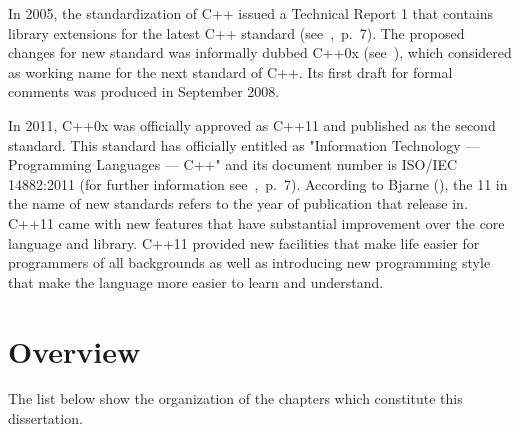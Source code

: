 \documentclass[11pt]{report}
\begin{document}
In 2005, the standardization of C++ issued a Technical Report 1 that contains library extensions for the latest C++ standard (see~\cite{Josuttis:2012:CppStandard},~p.~7). The proposed changes for new standard was informally dubbed C++0x (see~\cite{CplusplusHistoryofCpp}), which considered as working name for the next standard of C++. Its first draft for formal comments was produced in September 2008. 

In 2011, C++0x was officially approved as C++11 and published as the second standard. This standard has officially entitled as "Information Technology — Programming Languages — C++" and its document number is ISO/IEC 14882:2011 (for further information see~\cite{Josuttis:2012:CppStandard},~p.~7). According to Bjarne (\cite{Stroustrup:2012:Cpp11}), the 11 in the name of new standards refers to the year of publication that release in. C++11 came with new features that have substantial improvement over the core language and library. C++11 provided new facilities that make life easier for programmers of all backgrounds as well as introducing new programming style  that make the language more easier to learn and understand.

\section{Overview}
\label{sec:Overview}
The list below show the organization of the chapters which constitute this dissertation.
\end{document}
